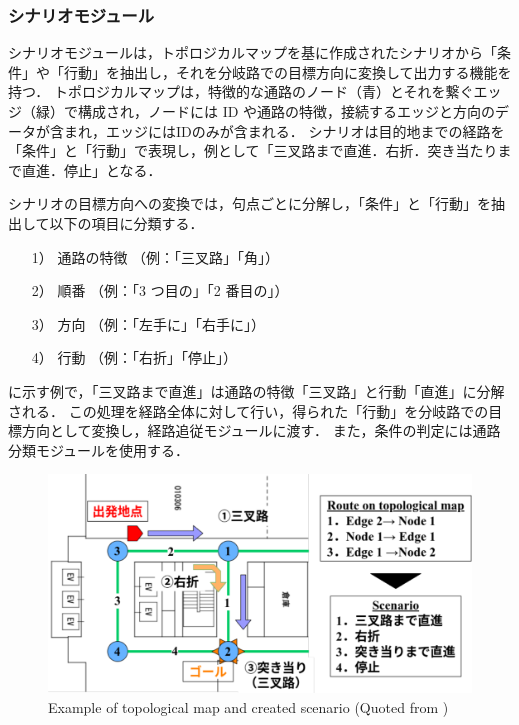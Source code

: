 \subsubsection{シナリオモジュール}
シナリオモジュールは，トポロジカルマップを基に作成されたシナリオから「条件」や「行動」を抽出し，それを分岐路での目標方向に変換して出力する機能を持つ．
トポロジカルマップは，特徴的な通路のノード（青）とそれを繋ぐエッジ（緑）で構成され，ノードには ID や通路の特徴，接続するエッジと方向のデータが含まれ，エッジにはIDのみが含まれる．
シナリオは目的地までの経路を「条件」と「行動」で表現し，例として「三叉路まで直進．右折．突き当たりまで直進．停止」となる．

シナリオの目標方向への変換では，句点ごとに分解し，「条件」と「行動」を抽出して以下の項目に分類する．
\begin{enumerate}
  \item [1）] 通路の特徴 （例：「三叉路」「角」）
  \item [2）] 順番 （例：「3 つ目の」「2 番目の」） 
  \item [3）] 方向 （例：「左手に」「右手に」）
  \item [4）] 行動 （例：「右折」「停止」）
\end{enumerate}

に示す例で，「三叉路まで直進」は通路の特徴「三叉路」と行動「直進」に分解される．
この処理を経路全体に対して行い，得られた「行動」を分岐路での目標方向として変換し，経路追従モジュールに渡す．
また，条件の判定には通路分類モジュールを使用する．

\begin{figure}[htbp]
  \centering
   \includegraphics[width=130mm]{images/pdf/haruyama/scenario.pdf}
   \caption[Example of topological map and created scenario]{Example of topological map and created scenario (Quoted from \cite{haruyama2023})}
   \label{fig:scenario}
\end{figure}

